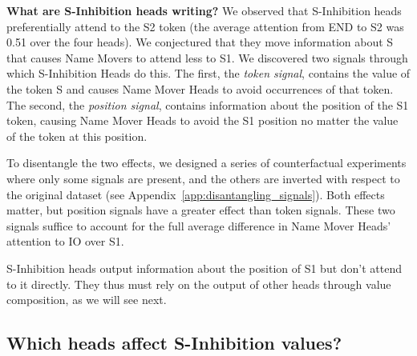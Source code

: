 
\textbf{What are S-Inhibition heads writing?}
We observed that S-Inhibition heads preferentially attend to the S2 token (the average attention from END to S2 was 0.51 over the four heads). We conjectured that they move information about S that causes Name Movers to attend less to S1. We discovered two signals through which S-Inhibition Heads do this. The first, the \emph{token signal}, contains the value of the token S and causes Name Mover Heads to avoid occurrences of that token. The second, the \emph{position signal}, contains information about the position of the S1 token, causing Name Mover Heads to avoid the S1 position no matter the value of the token at this position.

To disentangle the two effects, we designed a series of counterfactual experiments where only some signals are present, and the others are inverted with respect to the original dataset (see Appendix~\ref{app:disantangling_signals}). 
Both effects matter, but position signals have a greater effect than token signals. These two signals suffice to account for the full average difference in Name Mover Heads' attention to IO over S1.

S-Inhibition heads output information about the position of S1 but don't attend to it directly. They thus must rely on the output of other heads through value composition, as we will see next.

\subsection{Which heads affect S-Inhibition values?}
\label{sec:s_inhibition2}

